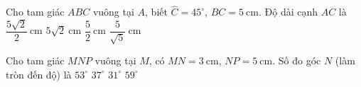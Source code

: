 \begin{ex}%
	Cho tam giác $ABC$ vuông tại $A$, biết $\widehat{C}=45^\circ$, $BC=5\mathrm{~cm}$. Độ dài cạnh $AC$ là
	\choice
	{\True $\dfrac{5\sqrt{2}}{2}\mathrm{~cm}$}
	{$5\sqrt{2}\mathrm{~cm}$}
	{$\dfrac{5}{2}\mathrm{~cm}$}
	{$\dfrac{5}{\sqrt{5}}\mathrm{~cm}$}
\end{ex}
\begin{ex}%
	Cho tam giác $MNP$ vuông tại $M$, có $MN=3\mathrm{~cm}$, $NP=5\mathrm{~cm}$. Số đo góc $N$ (làm tròn đến độ) là
	\choice
	{\True $53^\circ$}
	{$37^\circ$}
	{$31^\circ$}
	{$59^\circ$}
\end{ex}
